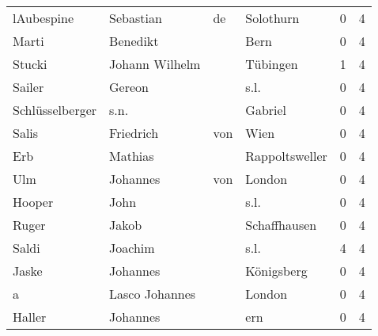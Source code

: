 \begin{tabular}{llllrr}
               lAubespine &                          Sebastian &          de &                                   Solothurn &          0 &         4 \\
                    Marti &                           Benedikt &             &                                        Bern &          0 &         4 \\
                   Stucki &                     Johann Wilhelm &             &                                    Tübingen &          1 &         4 \\
                   Sailer &                             Gereon &             &                                        s.l. &          0 &         4 \\
          Schlüsselberger &                               s.n. &             &                                     Gabriel &          0 &         4 \\
                    Salis &                          Friedrich &         von &                                        Wien &          0 &         4 \\
                      Erb &                            Mathias &             &                              Rappoltsweller &          0 &         4 \\
                      Ulm &                           Johannes &         von &                                      London &          0 &         4 \\
                   Hooper &                               John &             &                                        s.l. &          0 &         4 \\
                    Ruger &                              Jakob &             &                                Schaffhausen &          0 &         4 \\
                    Saldi &                            Joachim &             &                                        s.l. &          4 &         4 \\
                    Jaske &                           Johannes &             &                                  Königsberg &          0 &         4 \\
                        a &                     Lasco Johannes &             &                                      London &          0 &         4 \\
                   Haller &                           Johannes &             &                                         ern &          0 &         4 \\

\end{tabular}
